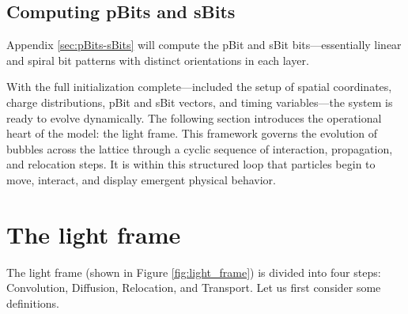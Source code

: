 \documentclass[12pt]{article}
\begin{document}
\subsection{Computing pBits and sBits}
Appendix \ref{sec:pBits-sBits} will compute the pBit and sBit bits—essentially linear and spiral bit patterns with distinct orientations in each layer.

With the full initialization complete—included the setup of spatial coordinates, charge distributions, pBit and sBit vectors, and timing variables—the system is ready to evolve dynamically. The following section introduces the operational heart of the model: the light frame. This framework governs the evolution of bubbles across the lattice through a cyclic sequence of interaction, propagation, and relocation steps. It is within this structured loop that particles begin to move, interact, and display emergent physical behavior.


\section{The light frame}\label{sec:light-frame}

The light frame (shown in Figure \ref{fig:light_frame}) is divided into four steps: Convolution, Diffusion, Relocation, and Transport. Let us first consider some definitions.
\end{document}
